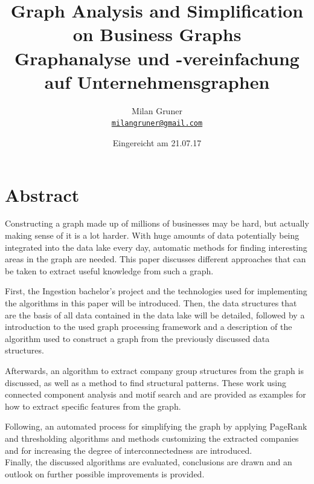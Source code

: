 \documentclass[
        a4paper,     %
        titlepage,   %
        oneside,     %
        parskip      %
]{scrartcl}          %
\title{
  Graph Analysis and Simplification on Business Graphs
  \\ \bigskip
  \large{Graphanalyse und -vereinfachung auf Unternehmensgraphen}
}
\author{Milan Gruner\\\small{\href{mailto:milangruner@gmail.com}{\nolinkurl{milangruner@gmail.com}}}}
\date{Eingereicht am 21.07.17}
\begin{document}
  \maketitle %
  \clearpage %

  \section*{Abstract}
  { \large
    Constructing a graph made up of millions of businesses may be hard, but actually making sense of it is a lot harder.
    With huge amounts of data potentially being integrated into the data lake every day, automatic methods for finding interesting areas in the graph are needed.
    This paper discusses different approaches that can be taken to extract useful knowledge from such a graph.

    First, the Ingestion bachelor's project and the technologies used
    for implementing the algorithms in this paper will be introduced.
    Then, the data structures that are the basis of all data contained in the
    data lake will be detailed, followed by a introduction to the used graph processing
    framework and a description of the algorithm used to construct a graph from the
    previously discussed data structures.

    Afterwards, an algorithm to extract company group structures from the graph
    is discussed, as well as a method to find structural patterns. These work using
    connected component analysis and motif search and are provided as examples for
    how to extract specific features from the graph.

    Following, an automated process for simplifying the graph by applying PageRank
    and thresholding algorithms and methods customizing the extracted companies
    and for increasing the degree of interconnectedness are introduced.\\
    Finally, the discussed algorithms are evaluated, conclusions are drawn
    and an outlook on further possible improvements is provided.
  }

  \clearpage
  \tableofcontents
  \pagebreak

\end{document}
